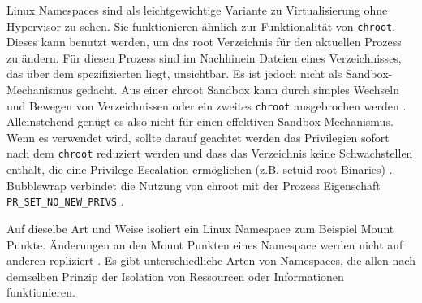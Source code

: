 Linux Namespaces sind als leichtgewichtige Variante zu Virtualisierung ohne Hypervisor zu sehen. Sie funktionieren ähnlich zur Funktionalität von \texttt{chroot}. Dieses kann benutzt werden, um das root Verzeichnis für den aktuellen Prozess zu ändern. Für diesen Prozess sind im Nachhinein Dateien eines Verzeichnisses, das über dem spezifizierten liegt, unsichtbar. Es ist jedoch nicht als Sandbox-Mechanismus gedacht. Aus einer chroot Sandbox kann
durch simples Wechseln und Bewegen von Verzeichnissen oder ein zweites \texttt{chroot} ausgebrochen werden \cite{man-chroot, second-chroot}. Alleinstehend genügt es also nicht für einen effektiven Sandbox-Mechanismus. Wenn es verwendet wird, sollte darauf geachtet werden das Privilegien sofort nach dem \texttt{chroot} reduziert werden und dass das Verzeichnis keine Schwachstellen enthält, die eine Privilege Escalation ermöglichen (z.B. setuid-root Binaries) \cite{second-chroot}.
Bubblewrap verbindet die Nutzung von chroot mit der Prozess Eigenschaft \texttt{PR\_SET\_NO\_NEW\_PRIVS} \cite{bubblewrap}.

Auf dieselbe Art und Weise isoliert ein Linux Namespace zum Beispiel Mount Punkte. Änderungen an den Mount Punkten eines Namespace
werden nicht auf anderen repliziert \cite{man-mount-ns}.
Es gibt unterschiedliche Arten von Namespaces, die allen nach demselben Prinzip der Isolation von Ressourcen oder Informationen funktionieren.

\begin{table}[H]
\label{tab:ns}
\centering
{}
\caption{Aus \cite{man-ns-7}}
\end{table}

